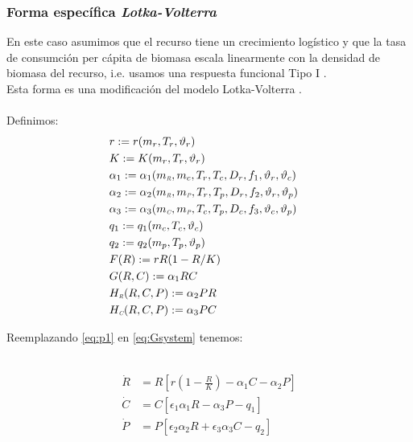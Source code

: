 \subsubsection{Forma espec\'ifica  \emph{Lotka-Volterra}}
En este caso asumimos que el recurso tiene un crecimiento log\'istico y que la tasa de consumci\'on per c\'apita de biomasa escala linearmente con la densidad de biomasa del recurso, i.e. usamos una respuesta funcional Tipo I \citep{gotelliprimer}.\\
Esta forma es una modificaci\'on del modelo Lotka-Volterra \citep{gotelliprimer}.\\
\mbox{}\\
Definimos:
\begin{equation}\label{eq:p1}
\begin{aligned}
&r := r(m_r,T_r,\vartheta_r)&\\ 
&K := K(m_r,T_r,\vartheta_r)&\\
&\alpha_{1} := \alpha_{1}(m_{\textit{\tiny R}},m_c,T_r,T_c,D_r,f_1,\vartheta_r,\vartheta_c)&\\
&\alpha_{2} := \alpha_{2}(m_{\textit{\tiny R}},m_{\textit{\tiny P}},T_r,T_p,D_r,f_2,\vartheta_r,\vartheta_p)&\\
&\alpha_{3} := \alpha_{3}(m_{\textit{\tiny C}},m_{\textit{\tiny P}},T_c,T_p,D_c,f_3,\vartheta_c,\vartheta_p)& \\
&q_1 := q_1(m_c,T_c,\vartheta_c)& \\ 
&q_2 := q_2(m_p,T_p,\vartheta_p)&\\
&F(R):= rR(1-R/K)& \\
&G(R,C):= \alpha_1 RC &\\ 
&H_{\textit{\tiny R}}(R,C,P):= \alpha_2PR&\\
&H_{\textit{\tiny C}}(R,C,P):= \alpha_3PC&
\end{aligned}
\end{equation}

Reemplazando \eqref{eq:p1} en \eqref{eq:Gsystem} tenemos:

\
\begin{equation}
\begin{aligned} 
\dot{R} &= R\left[ r(1-\frac{R}{K})- \alpha_1 C -\alpha_2 P \right] \\
\dot{C} &= C \left[ \epsilon_1 \alpha_1 R - \alpha_3  P - q_1 \right] \\
\dot{P} &= P \left[ \epsilon_2 \alpha_2 R + \epsilon_3 \alpha_3 C - q_2 \right]
\end{aligned}
\end{equation}

